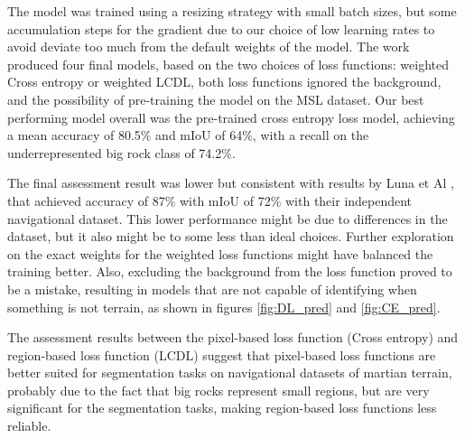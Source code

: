 \documentclass[10pt, conference]{IEEEtran}
\begin{document}
The model was trained using a resizing strategy with small batch sizes, but some accumulation steps
for the gradient due to our choice of low learning rates to avoid deviate too much from the default weights
of the model. The work produced four final models, based on the two choices of loss functions: weighted
Cross entropy
or weighted LCDL, both loss functions ignored the background, and the possibility of pre-training the model on the MSL dataset. Our best performing model
overall was the pre-trained cross entropy loss model, achieving a mean accuracy of 80.5\% and
mIoU of 64\%, with a recall on the underrepresented big rock class of 74.2\%.

The final assessment result was lower but consistent with results by Luna et Al \cite{Luna2025}, that achieved
accuracy of 87\% with mIoU of 72\% with their independent navigational dataset. This lower
performance might be due to differences in the dataset, but it also might be to some less than ideal choices.
Further exploration on the exact weights for the weighted loss functions might
have balanced the training better. Also, excluding the background from the loss function proved
to be a mistake, resulting in models that are not capable of identifying when something is not terrain,
as shown in figures \ref{fig:DL_pred} and \ref{fig:CE_pred}.

The assessment results between the pixel-based loss function (Cross entropy) and region-based loss
function (LCDL) suggest that pixel-based loss functions are better suited for segmentation tasks on
navigational datasets of martian terrain, probably due to the fact that big rocks represent small regions,
but are very significant for the segmentation tasks, making region-based loss functions less reliable.

 
\end{document}
